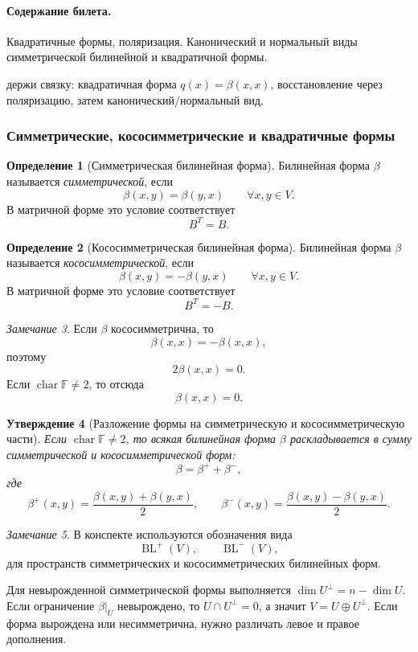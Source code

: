 \documentclass[12pt,a4paper]{article}
\theoremstyle{definition}
\newtheorem{definition}{Определение}[section]
\theoremstyle{plain}
\newtheorem{proposition}[definition]{Утверждение}
\theoremstyle{remark}
\newtheorem{remark}[definition]{Замечание}
\newenvironment{planadd}{\begin{planbox}}{\end{planbox}}
\newenvironment{knowledgefix}{\begin{clarifybox}}{\end{clarifybox}}
\newcommand{\F}{\mathbb{F}}
\newcommand{\BL}{\operatorname{BL}}
\begin{document}
\paragraph{Содержание билета.} Квадратичные формы, поляризация. Канонический и нормальный виды симметрической билинейной и квадратичной формы.

\begin{planadd}

держи связку: квадратичная форма $q(x)=\beta(x,x)$, восстановление через поляризацию, затем канонический/нормальный вид.

\end{planadd}

\subsubsection{Симметрические, кососимметрические и квадратичные формы}


\begin{definition}[Симметрическая билинейная форма]
Билинейная форма $\beta$ называется \emph{симметрической}, если
\[
    \beta(x,y)=\beta(y,x)
    \qquad \forall x,y\in V.
\]
В матричной форме это условие соответствует
\[
    B^T=B.
\]
\end{definition}

\begin{definition}[Кососимметрическая билинейная форма]
Билинейная форма $\beta$ называется \emph{кососимметрической}, если
\[
    \beta(x,y)=-\beta(y,x)
    \qquad \forall x,y\in V.
\]
В матричной форме это условие соответствует
\[
    B^T=-B.
\]
\end{definition}

\begin{remark}
Если $\beta$ кососимметрична, то
\[
    \beta(x,x)=-\beta(x,x),
\]
поэтому
\[
    2\beta(x,x)=0.
\]
Если $\operatorname{char}\F\ne 2$, то отсюда
\[
    \beta(x,x)=0.
\]
\end{remark}

\begin{proposition}[Разложение формы на симметрическую и кососимметрическую части]
Если $\operatorname{char}\F\ne2$, то всякая билинейная форма $\beta$ раскладывается в сумму симметрической и кососимметрической форм:
\[
    \beta=\beta^+ + \beta^-,
\]
где
\[
    \beta^+(x,y)=\frac{\beta(x,y)+\beta(y,x)}{2},
    \qquad
    \beta^-(x,y)=\frac{\beta(x,y)-\beta(y,x)}{2}.
\]
\end{proposition}

\begin{remark}
В конспекте используются обозначения вида
\[
    \BL^+(V),\qquad \BL^-(V),
\]
для пространств симметрических и кососимметрических билинейных форм.
\begin{knowledgefix}
Для невырожденной симметрической формы выполняется \(\dim U^\perp=n-\dim U\). Если ограничение \(\beta|_U\) невырождено, то \(U\cap U^\perp=0\), а значит \(V=U\oplus U^\perp\). Если форма вырождена или несимметрична, нужно различать левое и правое дополнения.
\end{knowledgefix}
\end{remark}
\end{document}
